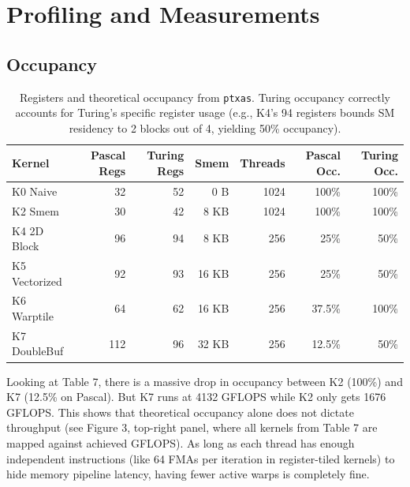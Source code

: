 \documentclass[11pt]{article}
\begin{document}
\section{Profiling and Measurements}

\subsection{Occupancy}

\begin{table}[h]
\centering
\begin{tabular}{|l|r|r|r|r|r|r|}
\hline
\textbf{Kernel} & \textbf{Pascal Regs} & \textbf{Turing Regs} & \textbf{Smem} & \textbf{Threads} & \textbf{Pascal Occ.} & \textbf{Turing Occ.} \\
\hline
K0 Naive & 32 & 52 & 0 B & 1024 & 100\% & 100\% \\
K2 Smem & 30 & 42 & 8 KB & 1024 & 100\% & 100\% \\
K4 2D Block & 96 & 94 & 8 KB & 256 & 25\% & 50\% \\
K5 Vectorized & 92 & 93 & 16 KB & 256 & 25\% & 50\% \\
K6 Warptile & 64 & 62 & 16 KB & 256 & 37.5\% & 100\% \\
K7 DoubleBuf & 112 & 96 & 32 KB & 256 & 12.5\% & 50\% \\
\hline
\end{tabular}
\caption{Registers and theoretical occupancy from \texttt{ptxas}. Turing occupancy correctly accounts for Turing's specific register usage (e.g., K4's 94 registers bounds SM residency to 2 blocks out of 4, yielding 50\% occupancy).}
\end{table}

Looking at Table 7, there is a massive drop in occupancy between K2 (100\%) and K7 (12.5\% on Pascal). But K7 runs at 4132 GFLOPS while K2 only gets 1676 GFLOPS. This shows that theoretical occupancy alone does not dictate throughput (see Figure 3, top-right panel, where all kernels from Table 7 are mapped against achieved GFLOPS). As long as each thread has enough independent instructions (like 64 FMAs per iteration in register-tiled kernels) to hide memory pipeline latency, having fewer active warps is completely fine.
\end{document}
